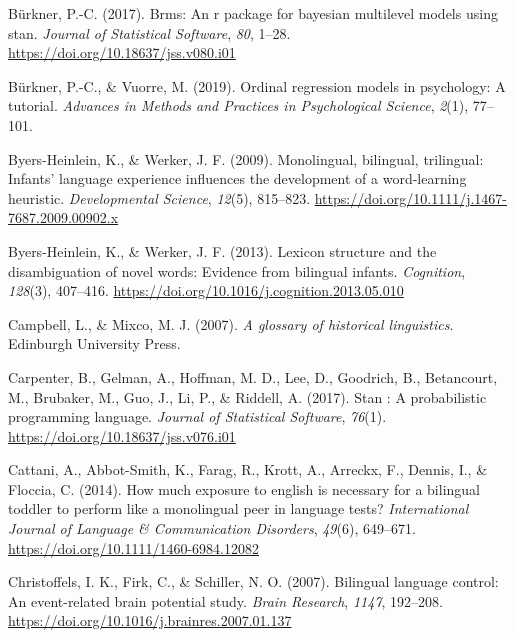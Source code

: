 \documentclass[
  man,
  floatsintext,
  colorlinks=true,linkcolor=blue,citecolor=blue,urlcolor=blue,biblatex]{apa7}
\newlength{\cslhangindent}
\newlength{\cslentryspacingunit} %
\newenvironment{CSLReferences}[2] %
 {%
  \setlength{\parindent}{0pt}
  \ifodd #1
  \let\oldpar\par
  \def\par{\hangindent=\cslhangindent\oldpar}
  \fi
  \setlength{\parskip}{#2\cslentryspacingunit}
 }%
 {}
\begin{document}
\begin{CSLReferences}{1}{0}
\leavevmode{}%
Bürkner, P.-C. (2017). Brms: An r package for bayesian multilevel models
using stan. \emph{Journal of Statistical Software}, \emph{80}, 1--28.
\url{https://doi.org/10.18637/jss.v080.i01}

\leavevmode{}%
Bürkner, P.-C., \& Vuorre, M. (2019). Ordinal regression models in
psychology: A tutorial. \emph{Advances in Methods and Practices in
Psychological Science}, \emph{2}(1), 77--101.

\leavevmode{}%
Byers-Heinlein, K., \& Werker, J. F. (2009). Monolingual, bilingual,
trilingual: Infants' language experience influences the development of a
word-learning heuristic. \emph{Developmental Science}, \emph{12}(5),
815--823. \url{https://doi.org/10.1111/j.1467-7687.2009.00902.x}

\leavevmode{}%
Byers-Heinlein, K., \& Werker, J. F. (2013). Lexicon structure and the
disambiguation of novel words: Evidence from bilingual infants.
\emph{Cognition}, \emph{128}(3), 407--416.
\url{https://doi.org/10.1016/j.cognition.2013.05.010}

\leavevmode{}%
Campbell, L., \& Mixco, M. J. (2007). \emph{A glossary of historical
linguistics}. Edinburgh University Press.

\leavevmode{}%
Carpenter, B., Gelman, A., Hoffman, M. D., Lee, D., Goodrich, B.,
Betancourt, M., Brubaker, M., Guo, J., Li, P., \& Riddell, A. (2017).
Stan : A probabilistic programming language. \emph{Journal of
Statistical Software}, \emph{76}(1).
\url{https://doi.org/10.18637/jss.v076.i01}

\leavevmode{}%
Cattani, A., Abbot-Smith, K., Farag, R., Krott, A., Arreckx, F., Dennis,
I., \& Floccia, C. (2014). How much exposure to english is necessary for
a bilingual toddler to perform like a monolingual peer in language
tests? \emph{International Journal of Language \& Communication
Disorders}, \emph{49}(6), 649--671.
\url{https://doi.org/10.1111/1460-6984.12082}

\leavevmode{}%
Christoffels, I. K., Firk, C., \& Schiller, N. O. (2007). Bilingual
language control: An event-related brain potential study. \emph{Brain
Research}, \emph{1147}, 192--208.
\url{https://doi.org/10.1016/j.brainres.2007.01.137}


\end{CSLReferences}
\end{document}
